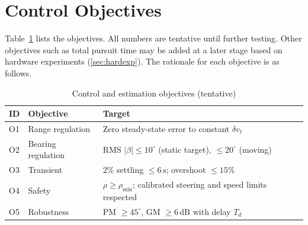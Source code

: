\documentclass[journal,a4paper]{IEEEtran}
\begin{document}
\section{Control Objectives}
\label{sec:control}

Table~\ref{tab:spec} lists the objectives. All numbers are tentative until further testing. Other objectives such as total pursuit time may be added at a later stage based on hardware experiments (\autoref{sec:hardexp}). The rationale for each objective is as follows.

\begin{table}[t!]
\caption{Control and estimation objectives (tentative)}
\label{tab:spec}
\centering
\footnotesize
\renewcommand{\arraystretch}{1.15}
\begin{tabular}{@{}l p{2.1cm} p{5.0cm}@{}}
\toprule
ID & Objective & Target \\
\midrule
O1 & Range regulation & Zero steady-state error to constant $\delta v_t$ \\
O2 & Bearing regulation & RMS $|\beta|\le10^\circ$ (static target), $\le20^\circ$ (moving) \\
O3 & Transient & 2\% settling $\le6\,\mathrm{s}$; overshoot $\le15\%$ \\
O4 & Safety & $\rho\ge\rho_{\min}$; calibrated steering and speed limits respected \\
O5 & Robustness & PM $\ge45^\circ$, GM $\ge6\,\mathrm{dB}$ with delay $T_d$ \\
\bottomrule
\end{tabular}
\end{table}
\end{document}
